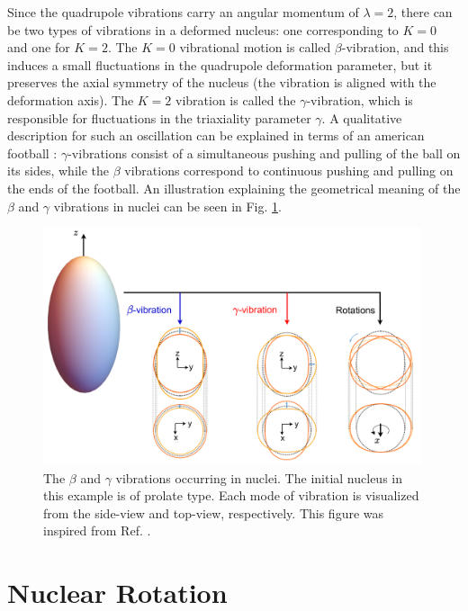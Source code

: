 Since the quadrupole vibrations carry an angular momentum of $\lambda=2$, there can be two types of vibrations in a deformed nucleus: one corresponding to $K=0$ and one for $K=2$. The $K=0$ vibrational motion is called $\beta$-vibration, and this induces a small fluctuations in the quadrupole deformation parameter, but it preserves the axial symmetry of the nucleus (the vibration is aligned with the deformation axis). The $K=2$ vibration is called the $\gamma$-vibration, which is responsible for fluctuations in the triaxiality parameter $\gamma$. A qualitative description for such an oscillation can be explained in terms of an american football \cite{krane1991introductory}: $\gamma$-vibrations consist of a simultaneous pushing and pulling of the ball on its sides, while the $\beta$ vibrations correspond to continuous pushing and pulling on the ends of the football. An illustration explaining the geometrical meaning of the $\beta$ and $\gamma$ vibrations in nuclei can be seen in Fig. \ref{rotation-vibration-geometrics}.
\begin{figure}
    \centering
    \includegraphics[width=0.99\textwidth]{Chapters/Figures/rotationsVibrations_Rotations.pdf}
    \caption{The $\beta$ and $\gamma$ vibrations occurring in nuclei. The initial nucleus in this example is of prolate type. Each mode of vibration is visualized from the side-view and top-view, respectively. This figure was inspired from Ref. \cite{li2022model}.}
    \label{rotation-vibration-geometrics}
\end{figure}

\section{Nuclear Rotation}

